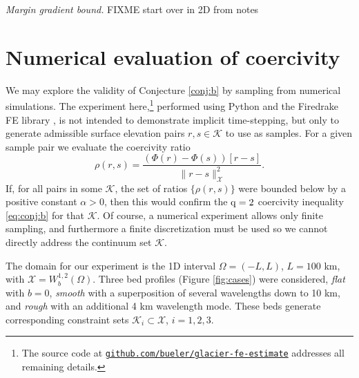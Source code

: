\documentclass[hidelinks,onefignum,onetabnum,final]{siamart220329}  %
\newcommand{\cK}{\mathcal{K}}
\newcommand{\cX}{\mathcal{X}}
\newcommand{\qq}{{\text{\textnormal{q}}}}
\begin{document}
\smallskip
\emph{Margin gradient bound.}  FIXME start over in 2D from notes


\section{Numerical evaluation of coercivity} \label{sec:numerical}

We may explore the validity of Conjecture \ref{conj:b} by sampling from numerical simulations.  The experiment here,\footnote{The source code at \href{https://github.com/bueler/glacier-fe-estimate}{\texttt{github.com/bueler/glacier-fe-estimate}} addresses all remaining details.} performed using Python and the Firedrake FE library \cite{Hametal2023}, is not intended to demonstrate implicit time-stepping, but only to generate admissible surface elevation pairs $r,s\in\cK$ to use as samples.  For a given sample pair we evaluate the coercivity ratio
\begin{equation}
\rho(r,s) = \frac{\left(\Phi(r) - \Phi(s)\right)[r-s]}{\|r-s\|_{\cX}^2}. \label{eq:Phiratio}
\end{equation}
If, for all pairs in some $\cK$, the set of ratios $\{\rho(r,s)\}$ were bounded below by a positive constant $\alpha>0$, then this would confirm the $\qq=2$ coercivity inequality \eqref{eq:conj:b} for that $\cK$.  Of course, a numerical experiment allows only finite sampling, and furthermore a finite discretization must be used so we cannot directly address the continuum set $\cK$.

The domain for our experiment is the 1D interval $\Omega=(-L,L)$, $L=100$ km, with $\cX = W_b^{1,2}(\Omega)$.  Three bed profiles  (Figure \ref{fig:cases}) were considered, \emph{flat} with $b=0$, \emph{smooth} with a superposition of several wavelengths down to 10 km, and \emph{rough} with an additional 4 km wavelength mode.  These beds generate corresponding constraint sets $\cK_i \subset \cX$, $i=1,2,3$.
\end{document}
